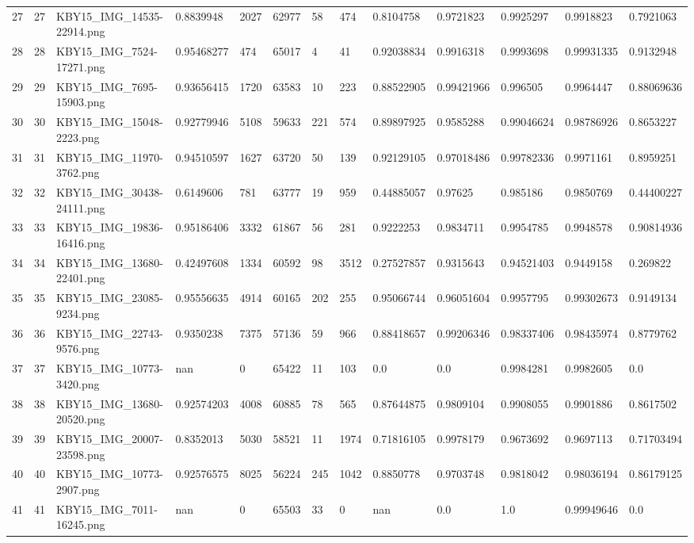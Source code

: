 \documentclass[11pt, a4paper, twoside]{report}
\begin{document}
\begin{longtable}[c]{@{}lllllllllllll@{}}
27 & 27 & KBY15\_IMG\_14535-22914.png & 0.8839948 & 2027 & 62977 & 58 & 474 & 0.8104758 & 0.9721823 & 0.9925297 & 0.9918823 & 0.7921063 \\
28 & 28 & KBY15\_IMG\_7524-17271.png & 0.95468277 & 474 & 65017 & 4 & 41 & 0.92038834 & 0.9916318 & 0.9993698 & 0.99931335 & 0.9132948 \\
29 & 29 & KBY15\_IMG\_7695-15903.png & 0.93656415 & 1720 & 63583 & 10 & 223 & 0.88522905 & 0.99421966 & 0.996505 & 0.9964447 & 0.88069636 \\
30 & 30 & KBY15\_IMG\_15048-2223.png & 0.92779946 & 5108 & 59633 & 221 & 574 & 0.89897925 & 0.9585288 & 0.99046624 & 0.98786926 & 0.8653227 \\
31 & 31 & KBY15\_IMG\_11970-3762.png & 0.94510597 & 1627 & 63720 & 50 & 139 & 0.92129105 & 0.97018486 & 0.99782336 & 0.9971161 & 0.8959251 \\
32 & 32 & KBY15\_IMG\_30438-24111.png & 0.6149606 & 781 & 63777 & 19 & 959 & 0.44885057 & 0.97625 & 0.985186 & 0.9850769 & 0.44400227 \\
33 & 33 & KBY15\_IMG\_19836-16416.png & 0.95186406 & 3332 & 61867 & 56 & 281 & 0.9222253 & 0.9834711 & 0.9954785 & 0.9948578 & 0.90814936 \\
34 & 34 & KBY15\_IMG\_13680-22401.png & 0.42497608 & 1334 & 60592 & 98 & 3512 & 0.27527857 & 0.9315643 & 0.94521403 & 0.9449158 & 0.269822 \\
35 & 35 & KBY15\_IMG\_23085-9234.png & 0.95556635 & 4914 & 60165 & 202 & 255 & 0.95066744 & 0.96051604 & 0.9957795 & 0.99302673 & 0.9149134 \\
36 & 36 & KBY15\_IMG\_22743-9576.png & 0.9350238 & 7375 & 57136 & 59 & 966 & 0.88418657 & 0.99206346 & 0.98337406 & 0.98435974 & 0.8779762 \\
37 & 37 & KBY15\_IMG\_10773-3420.png & nan & 0 & 65422 & 11 & 103 & 0.0 & 0.0 & 0.9984281 & 0.9982605 & 0.0 \\
38 & 38 & KBY15\_IMG\_13680-20520.png & 0.92574203 & 4008 & 60885 & 78 & 565 & 0.87644875 & 0.9809104 & 0.9908055 & 0.9901886 & 0.8617502 \\
39 & 39 & KBY15\_IMG\_20007-23598.png & 0.8352013 & 5030 & 58521 & 11 & 1974 & 0.71816105 & 0.9978179 & 0.9673692 & 0.9697113 & 0.71703494 \\
40 & 40 & KBY15\_IMG\_10773-2907.png & 0.92576575 & 8025 & 56224 & 245 & 1042 & 0.8850778 & 0.9703748 & 0.9818042 & 0.98036194 & 0.86179125 \\
41 & 41 & KBY15\_IMG\_7011-16245.png & nan & 0 & 65503 & 33 & 0 & nan & 0.0 & 1.0 & 0.99949646 & 0.0 \\

\end{longtable}
\end{document}
